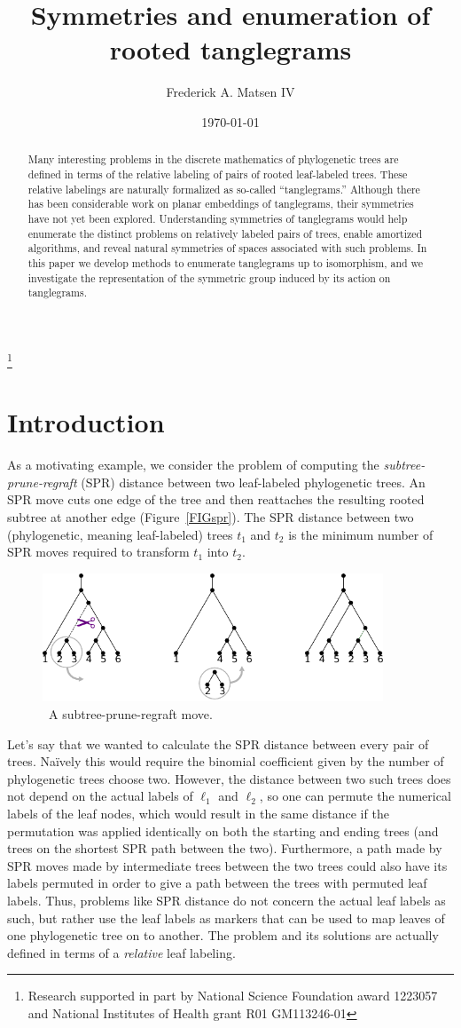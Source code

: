 \documentclass{amsart}
\newcommand{\arxiv}[1]{#1}
\newcommand{\FIGspr}{\
\label{FIGspr}
\begin{figure}
  \arxiv{\includegraphics[width=4in]{figures/spr-definition}}
\caption{\
  A subtree-prune-regraft move.
}
\end{figure}
}
\begin{document}
\title{Symmetries and enumeration of rooted tanglegrams}
\author[Matsen]{Frederick A. Matsen IV}
\address{Fred Hutchinson Cancer Research Center \\ Seattle, WA}
\thanks{Research supported in part by National Science Foundation award 1223057 and National Institutes of Health grant R01 GM113246-01}


\date{\today}

\begin{abstract}
Many interesting problems in the discrete mathematics of phylogenetic trees are defined in terms of the relative labeling of pairs of rooted leaf-labeled trees.
These relative labelings are naturally formalized as so-called ``tanglegrams.''
Although there has been considerable work on planar embeddings of tanglegrams, their symmetries have not yet been explored.
Understanding symmetries of tanglegrams would help enumerate the distinct problems on relatively labeled pairs of trees, enable amortized algorithms, and reveal natural symmetries of spaces associated with such problems.
In this paper we develop methods to enumerate tanglegrams up to isomorphism, and we investigate the representation of the symmetric group induced by its action on tanglegrams.
\end{abstract}

\maketitle


\section{Introduction}
As a motivating example, we consider the problem of computing the \emph{subtree-prune-regraft} (SPR) distance between two leaf-labeled phylogenetic trees.
An SPR move cuts one edge of the tree and then reattaches the resulting rooted subtree at another edge (Figure~\ref{FIGspr}).
The SPR distance between two (phylogenetic, meaning leaf-labeled) trees $t_1$ and $t_2$ is the minimum number of SPR moves required to transform $t_1$ into $t_2$.
\FIGspr

Let's say that we wanted to calculate the SPR distance between every pair of trees.
Na\"ively this would require the binomial coefficient given by the number of phylogenetic trees choose two.
However, the distance between two such trees does not depend on the actual labels of $\ell_1$ and $\ell_2$, so one can permute the numerical labels of the leaf nodes, which would result in the same distance if the permutation was applied identically on both the starting and ending trees (and trees on the shortest SPR path between the two).
Furthermore, a path made by SPR moves made by intermediate trees between the two trees could also have its labels permuted in order to give a path between the trees with permuted leaf labels.
Thus, problems like SPR distance do not concern the actual leaf labels as such, but rather use the leaf labels as markers that can be used to map leaves of one phylogenetic tree on to another.
The problem and its solutions are actually defined in terms of a \emph{relative} leaf labeling.
\end{document}
